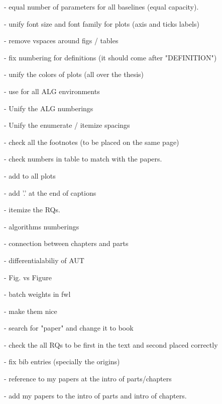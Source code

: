  - equal number of parameters for all baselines (equal capacity).

 - unify font size and font family for plots (axis and ticks labels)

 - remove vspaces around figs / tables
 
 - fix numbering for definitions (it should come after "DEFINITION")
 
 - unify the colors of plots (all over the thesis)
 
 - use \small for all ALG environments
 
 - Unify the ALG numberings
 
 - Unify the enumerate / itemize spacings
 
 - check all the footnotes (to be placed on the same page)
 
 - check numbers in table to match with the papers.
 
 - add \selectfont to all plots
 
 - add '.' at the end of captions
 
 - itemize the RQs.
 
 - algorithms numberings
 
 - connection between chapters and parts
 
 - differentialabiliy of AUT
 
 - Fig. vs Figure
 
 - batch weights in fwl
 
 - \url{} make them nice
 
 - search for "paper" and change it to book
 
 - check the all RQs to be first in the text and second placed correctly
 
 - fix bib entries (specially the origins)
 
 - reference to my papers at the intro of parts/chapters
 
 - add my papers to the intro of parts and intro of chapters.
